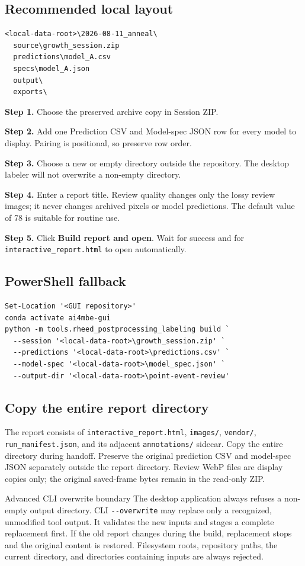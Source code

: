 \documentclass[10pt,a4paper]{article}
\newcommand{\step}[2]{
  \begin{tcolorbox}[
    enhanced,colback=white,colframe=ManualLine,boxrule=0.5pt,arc=1.5mm,
    left=2.5mm,right=2.5mm,top=1.5mm,bottom=1.5mm,before skip=1.5mm,after skip=1.5mm]
    \textcolor{ManualBlue}{\textbf{Step #1.}} #2
  \end{tcolorbox}
}
\begin{document}
\subsection{Recommended local layout}
\begin{lstlisting}
<local-data-root>\2026-08-11_anneal\
  source\growth_session.zip
  predictions\model_A.csv
  specs\model_A.json
  output\
  exports\
\end{lstlisting}

\step{1}{Choose the preserved archive copy in Session ZIP.}
\step{2}{Add one Prediction CSV and Model-spec JSON row for every model to display. Pairing is positional, so preserve row order.}
\step{3}{Choose a new or empty directory outside the repository. The desktop labeler will not overwrite a non-empty directory.}
\step{4}{Enter a report title. Review quality changes only the lossy review images; it never changes archived pixels or model predictions. The default value of 78 is suitable for routine use.}
\step{5}{Click \textbf{Build report and open}. Wait for success and for \texttt{interactive\_report.html} to open automatically.}

\subsection{PowerShell fallback}
\begin{lstlisting}
Set-Location '<GUI repository>'
conda activate ai4mbe-gui
python -m tools.rheed_postprocessing_labeling build `
  --session '<local-data-root>\growth_session.zip' `
  --predictions '<local-data-root>\predictions.csv' `
  --model-spec '<local-data-root>\model_spec.json' `
  --output-dir '<local-data-root>\point-event-review'
\end{lstlisting}

\subsection{Copy the entire report directory}
The report consists of \texttt{interactive\_report.html}, \texttt{images/}, \texttt{vendor/}, \texttt{run\_manifest.json}, and its adjacent \texttt{annotations/} sidecar. Copy the entire directory during handoff. Preserve the original prediction CSV and model-spec JSON separately outside the report directory. Review WebP files are display copies only; the original saved-frame bytes remain in the read-only ZIP.

\begin{warnbox}{Advanced CLI overwrite boundary}
The desktop application always refuses a non-empty output directory. CLI \texttt{-{}-overwrite} may replace only a recognized, unmodified tool output. It validates the new inputs and stages a complete replacement first. If the old report changes during the build, replacement stops and the original content is restored. Filesystem roots, repository paths, the current directory, and directories containing inputs are always rejected.
\end{warnbox}
\end{document}
